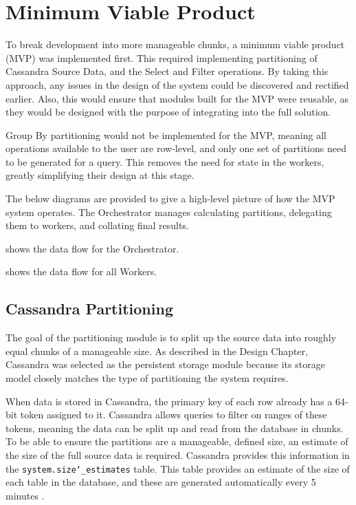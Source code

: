 \section{Minimum Viable Product}
To break development into more manageable chunks, a minimum viable product (MVP) was implemented first. This required implementing partitioning of Cassandra Source Data, and the Select and Filter operations. By taking this approach, any issues in the design of the system could be discovered and rectified earlier. Also, this would ensure that modules built for the MVP were reusable, as they would be designed with the purpose of integrating into the full solution.

Group By partitioning would not be implemented for the MVP, meaning all operations available to the user are row-level, and only one set of partitions need to be generated for a query. This removes the need for state in the workers, greatly simplifying their design at this stage.

The below diagrams are provided to give a high-level picture of how the MVP system operates. The Orchestrator manages calculating partitions, delegating them to workers, and collating final results. 

 shows the data flow for the Orchestrator.


 shows the data flow for all Workers.


\subsection{Cassandra Partitioning}
The goal of the partitioning module is to split up the source data into roughly equal chunks of a manageable size. As described in the Design Chapter, Cassandra was selected as the persistent storage module because its storage model closely matches the type of partitioning the system requires. 

When data is stored in Cassandra, the primary key of each row already has a 64-bit token assigned to it. Cassandra allows queries to filter on ranges of these tokens, meaning the data can be split up and read from the database in chunks. To be able to ensure the partitions are a manageable, defined size, an estimate of the size of the full source data is required. Cassandra provides this information in the \texttt{system.size\char`_estimates} table. This table provides an estimate of the size of each table in the database, and these are generated automatically every 5 minutes .

